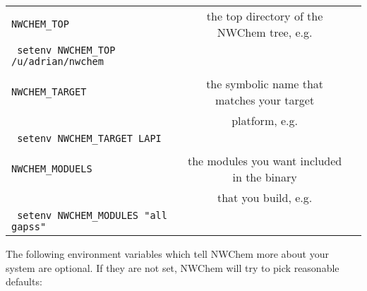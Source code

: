 \begin{table}[htbp]
\begin{center}
\begin{tabular}{lcc}
\verb+NWCHEM_TOP+                & the top directory of the NWChem tree, e.g.\\
   \verb+ setenv NWCHEM_TOP /u/adrian/nwchem+\\
\\
\verb+NWCHEM_TARGET+             & the symbolic name that matches your target
\\
                              & platform, e.g.\\
   \verb+ setenv NWCHEM_TARGET LAPI+\\
\\
\verb+NWCHEM_MODUELS+            & the modules you want included in the binary
\\
                              & that you build, e.g.\\
   \verb+ setenv NWCHEM_MODULES "all gapss"+
\end{tabular}
\end{center}
\end{table}

The following environment variables which tell NWChem more about your
system are optional.  If they are not set, NWChem will try to pick
reasonable defaults:

